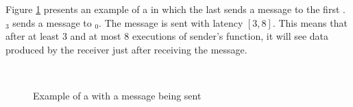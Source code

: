 Figure \ref{fig:message-example} presents an example of a
{\pipeline} in which the last {\filter} sends a message to the first
{\filter}.  {\filter}$_3$ sends a message to {\filter}$_0$.  The message
is sent with latency $[3,8]$. This means that after at least 3 and
at most 8 executions of sender's {\work} function, it will see data
produced by the receiver just after receiving the message.

\begin{figure}\begin{center}
\begin{minipage}{4in}
\centering
{} \\
\end{minipage}
\end{center}
\caption{Example of a {\pipeline} with a message being sent}
\label{fig:message-example}
\end{figure}
